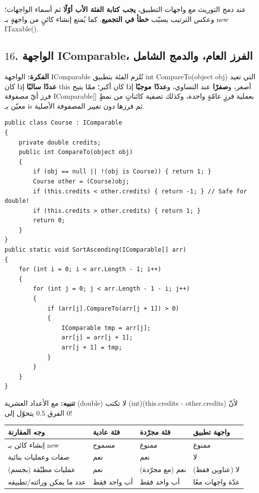 \documentclass[14pt]{extarticle}
\begin{document}
\begin{boxWarning}
عند دمج التوريث مع واجهات التطبيق، \textbf{يجب كتابة الفئة الأب أوّلًا} ثم أسماء الواجهات؛ وعكس الترتيب يسبّب \textbf{خطأ في التجميع}. كما يُمنع إنشاء كائنٍ من واجهةٍ بـ \textenglish{new ITaxable()}.
\end{boxWarning}

\filbreak
\subsection*{$16$. الواجهة \textenglish{IComparable}، الفرز العام، والدمج الشامل}
\textbf{الفكرة:} الواجهة \textenglish{IComparable} تُلزم الفئة بتطبيق \textenglish{int CompareTo(object obj)} التي تعيد \textbf{عددًا سالبًا} إذا كان \textenglish{this} أصغر، و\textbf{صفرًا} عند التساوي، و\textbf{عددًا موجبًا} إذا كان أكبر؛ ممّا يتيح فرز أيّ مصفوفة \textenglish{IComparable[]} بعملية فرزٍ عامّةٍ واحدة، وكذلك تصفية كائناتٍ من نمطٍ معيّن بـ \textenglish{is} ثم فرزها دون تغيير المصفوفة الأصلية.

\begin{boxCode}
\begin{english}
\begin{verbatim}
public class Course : IComparable
{
    private double credits;
    public int CompareTo(object obj)
    {
        if (obj == null || !(obj is Course)) { return 1; }
        Course other = (Course)obj;
        if (this.credits < other.credits) { return -1; } // Safe for double!
        if (this.credits > other.credits) { return 1; }
        return 0;
    }
}
public static void SortAscending(IComparable[] arr)
{
    for (int i = 0; i < arr.Length - 1; i++)
    {
        for (int j = 0; j < arr.Length - 1 - i; j++)
        {
            if (arr[j].CompareTo(arr[j + 1]) > 0)
            {
                IComparable tmp = arr[j];
                arr[j] = arr[j + 1];
                arr[j + 1] = tmp;
            }
        }
    }
}
\end{verbatim}
\end{english}
\end{boxCode}

\textbf{تنبيه:} مع الأعداد العشرية (\textenglish{double}) لا تكتب \textenglish{(int)(this.credits - other.credits)} لأنّ الفرق $0.5$ يتحوّل إلى $0$!

\filbreak
{\renewcommand{\arraystretch}{1.15}
\small
\begin{longtable}{|C{0.24\textwidth}|C{0.20\textwidth}|C{0.20\textwidth}|C{0.22\textwidth}|}
\hline
\textbf{وجه المقارنة} & \textbf{فئة عادية} & \textbf{فئة مجرّدة} & \textbf{واجهة تطبيق} \\
\hline
إنشاء كائن بـ \textenglish{new} & مسموح & ممنوع & ممنوع \\
\hline
صفات وعمليات بنائية & نعم & نعم & لا \\
\hline
عمليات مطبّقة (بجسم) & نعم & نعم (مع مجرّدة) & لا (عناوين فقط) \\
\hline
عدد ما يمكن وراثته/تطبيقه & أب واحد فقط & أب واحد فقط & عدّة واجهات معًا \\
\hline
\end{longtable}}
\end{document}
